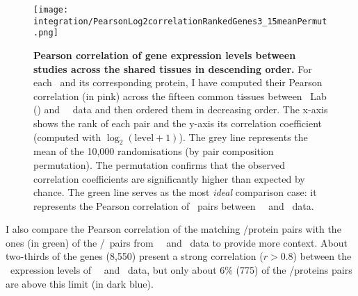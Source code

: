 \begin{figure}[!htb]
    \texttt{[image: integration/PearsonLog2correlationRankedGenes3\_15meanPermut.png]}\centering
    \vspace{-3mm}
    \caption[Pearson correlation coefficients of gene expression levels
    between studies in descending order]%
    {\label{fig:GeneProtCor}\textbf{Pearson correlation of gene expression levels
    between studies across the shared tissues in descending order.}
    For each \mRNA\ and its corresponding protein,
    I have computed their Pearson correlation (in pink)
    across the fifteen common tissues
    between \pandey\ Lab (\PPKM) and \uhlen\ \etal\ data
    and then ordered them in decreasing order.
    The x-axis shows the rank of each pair
    and the y-axis its correlation coefficient
    (computed with $\log_2(\text{level}+1)$).
    The grey line represents the mean of the 10,000 randomisations
    (by pair composition permutation).
    The permutation confirms that the observed correlation coefficients are
    significantly higher than expected by chance.
    The green line serves as the most \emph{ideal} comparison case:
    it represents the Pearson correlation of \mRNAs\ pairs
    between \uhlen\ \etal\ and \gtex\ data.
    }
    \vspace{-1em}
\end{figure}

I also compare the Pearson correlation of the matching \mRNAs/protein pairs
with the ones (in green) of the \mRNAs{}/\mRNAs\ pairs
from \uhlen\ \etal\ and \gtex\ data
to provide more context.
About two-thirds of the genes (8,550) present a strong correlation
($r>0.8$)
between the \mRNA\ expression levels of \uhlen\ \etal\ and \gtex\ data,
but only about 6\% (775) of the \mRNA/proteins pairs are above this limit
(in dark blue).\mybr\

